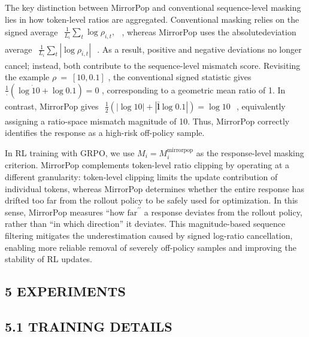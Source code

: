 \documentclass[
  10
]{article}
\begin{document}
The key distinction between MirrorPop and conventional sequence-level
masking lies in how token-level ratios are aggregated. Conventional
masking relies on the signed average
\(\begin{array} { r } { \frac { 1 } { L _ { i } } \sum _ { t } \log \rho _ { i , t } , } \end{array}\)
, whereas MirrorPop uses the absolutedeviation average
\(\begin{array} { r } { \frac { 1 } { L _ { i } } \sum _ { t } | \log \rho _ { i , t } | } \end{array}\)
. As a result, positive and negative deviations no longer cancel;
instead, both contribute to the sequence-level mismatch score.
Revisiting the example \(\rho ~ = ~ [ 1 0 , 0 . 1 ]\) , the conventional
signed statistic gives
\(\frac { 1 } { \cdot } ( \log \dot { 1 } 0 + \log 0 . 1 ) = 0\) ,
corresponding to a geometric mean ratio of 1. In contrast, MirrorPop
gives
\(\begin{array} { r } { \frac { 1 } { 2 } ( | \log 1 0 | + | \mathbf { \bar { l } } \log 0 . 1 | ) = \log 1 0 } \end{array}\)
, equivalently assigning a ratio-space mismatch magnitude of 10. Thus,
MirrorPop correctly identifies the response as a high-risk off-policy
sample.

In RL training with GRPO, we use
\(M _ { i } = M _ { i } ^ { \mathrm { m i r r o r p o p } }\) as the
response-level masking criterion. MirrorPop complements token-level
ratio clipping by operating at a different granularity: token-level
clipping limits the update contribution of individual tokens, whereas
MirrorPop determines whether the entire response has drifted too far
from the rollout policy to be safely used for optimization. In this
sense, MirrorPop measures ``how
\(\mathrm { f a r } ^ { \prime \prime }\) a response deviates from the
rollout policy, rather than ``in which direction'' it deviates. This
magnitude-based sequence filtering mitigates the underestimation caused
by signed log-ratio cancellation, enabling more reliable removal of
severely off-policy samples and improving the stability of RL updates.

\subsection{5 EXPERIMENTS}\label{experiments}

\subsection{5.1 TRAINING DETAILS}\label{training-details}
\end{document}

